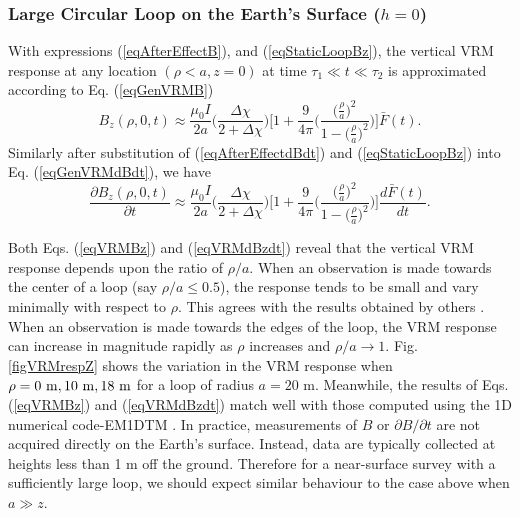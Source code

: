 \documentclass[onecolumn]{IEEEtran} %
\begin{document}
\subsubsection{Large Circular Loop on the Earth's Surface ($h=0$)} \label{secVertVRMresp} With expressions (\ref{eqAfterEffectB}), and (\ref{eqStaticLoopBz}), the vertical VRM response at any location $(\rho < a,z=0)$ at time $\tau_1 \ll t \ll \tau_2$ is approximated according to Eq. (\ref{eqGenVRMB})
\begin{equation}
B_z(\rho,0,t) \approx \frac{\mu_0 I}{2a} \Bigg ( \frac{\Delta
\chi}{2+\Delta \chi} \Bigg )  \Bigg [ 1 + \frac{9}{4\pi} \Bigg (
\frac{\big( \frac{\rho}{a} \big )^2}{1- \big( \frac{\rho}{a} \big
)^2} \Bigg ) \Bigg ] \bar F(t).
\label{eqVRMBz}
\end{equation}
Similarly after substitution of (\ref{eqAfterEffectdBdt}) and (\ref{eqStaticLoopBz}) into Eq. (\ref{eqGenVRMdBdt}), we have
\begin{equation} \frac{\partial B_z(\rho,0,t)}{\partial t}  \approx
\frac{\mu_0 I}{2a} \Bigg ( \frac{\Delta \chi}{2+\Delta \chi} \Bigg )
\Bigg [ 1 + \frac{9}{4\pi} \Bigg ( \frac{\big( \frac{\rho}{a} \big
)^2}{1- \big( \frac{\rho}{a} \big )^2} \Bigg ) \Bigg ] \frac{d \bar
F(t)}{dt}.
\label{eqVRMdBzdt}
\end{equation}

Both Eqs. (\ref{eqVRMBz}) and (\ref{eqVRMdBzdt}) reveal that the vertical VRM response depends upon the ratio of $\rho/a$. When an observation is made towards the center of a loop (say $\rho/a \leq 0.5$), the response tends to be small and vary minimally with respect to $\rho$. This agrees with the results obtained by others \citep{Buselli1982,Barsukov2001}. When an observation is made towards the edges of the loop, the VRM response can increase in magnitude rapidly as $\rho$ increases and $\rho/a \rightarrow 1$. Fig. \ref{figVRMrespZ} shows the variation in the VRM response when $\rho = 0 ~{\rm m}, 10 ~{\rm m}, 18 ~{\rm m}$ for a loop of radius $a=20$ m. Meanwhile, the results of Eqs. (\ref{eqVRMBz}) and (\ref{eqVRMdBzdt}) match well with those computed using the 1D numerical code-EM1DTM \cite{EM1DTM}. In practice, measurements of $B$ or $\partial B/\partial t$ are not acquired directly on the Earth's surface. Instead, data are typically collected at heights less than 1 m off the ground. Therefore for a near-surface survey with a sufficiently large loop, we should expect similar behaviour to the case above when $a \gg z$.
\\
\end{document}
